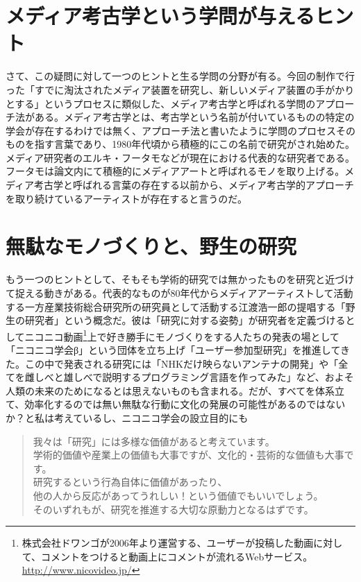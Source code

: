 \section{メディア考古学という学問が与えるヒント}\label{ux30e1ux30c7ux30a3ux30a2ux8003ux53e4ux5b66ux3068ux3044ux3046ux5b66ux554fux304cux4e0eux3048ux308bux30d2ux30f3ux30c8}

さて、この疑問に対して一つのヒントと生る学問の分野が有る。今回の制作で行った「すでに淘汰されたメディア装置を研究し、新しいメディア装置の手がかりとする」というプロセスに類似した、メディア考古学と呼ばれる学問のアプローチ法がある。メディア考古学とは、考古学という名前が付いているものの特定の学会が存在するわけでは無く、アプローチ法と書いたように学問のプロセスそのものを指す言葉であり、1980年代頃から積極的にこの名前で研究がされ始めた。メディア研究者のエルキ・フータモなどが現在における代表的な研究者である。\\
フータモは論文内にて積極的にメディアアートと呼ばれるモノを取り上げる。メディア考古学と呼ばれる言葉の存在する以前から、メディア考古学的アプローチを取り続けているアーティストが存在すると言うのだ。\\

\section{無駄なモノづくりと、野生の研究}\label{ux7121ux99c4ux306aux30e2ux30ceux3065ux304fux308aux3068ux91ceux751fux306eux7814ux7a76}

もう一つのヒントとして、そもそも学術的研究では無かったものを研究と近づけて捉える動きがある。代表的なものが80年代からメディアアーティストして活動する一方産業技術総合研究所の研究員として活動する江渡浩一郎の提唱する「野生の研究者」という概念だ。彼は「研究に対する姿勢」が研究者を定義づけるとしてニコニコ動画\footnote{株式会社ドワンゴが2006年より運営する、ユーザーが投稿した動画に対して、コメントをつけると動画上にコメントが流れるWebサービス。\url{http://www.nicovideo.jp/}}上で好き勝手にモノづくりをする人たちの発表の場として「ニコニコ学会β」という団体を立ち上げ「ユーザー参加型研究」を推進してきた。この中で発表される研究には「NHKだけ映らないアンテナの開発」や「全てを雌しべと雄しべで説明するプログラミング言語を作ってみた」など、およそ人類の未来のためになるとは思えないものも含まれる。だが、すべてを体系立て、効率化するのでは無い無駄な行動に文化の発展の可能性があるのではないか？と私は考えているし、ニコニコ学会の設立目的にも

\begin{quote}
我々は「研究」には多様な価値があると考えています。\\
学術的価値や産業上の価値も大事ですが、文化的・芸術的な価値も大事です。\\
研究するという行為自体に価値があったり、\\
他の人から反応があってうれしい！という価値でもいいでしょう。\\
そのいずれもが、研究を推進する大切な原動力となるはずです。
\end{quote}

